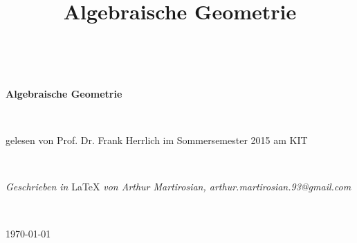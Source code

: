 \documentclass[11pt]{book}
\title{Algebraische Geometrie}
\theoremstyle{nonumberbreak}
\begin{document}
\begin{titlepage}

\textrm{ }\\[64pt]

\begin{center}
{\fontsize{40}{40} \selectfont \textbf{Algebraische Geometrie}}
\end{center}
\textrm{ } \\[36pt]
\begin{center} \large{\textrm{gelesen von Prof. Dr. Frank Herrlich im Sommersemester 2015 am KIT}} \end{center}
\textrm{ } \\[320pt]
\begin{center} \large{\textit{Geschrieben in } \LaTeX \textit{ von Arthur Martirosian, arthur.martirosian.93@gmail.com}}\end{center}
\textrm{ }\\[24pt]
\begin{center} \large{\today} \end{center}

\end{titlepage}
\thispagestyle{empty}



\begin{spacing}{1.62}
\setcounter{tocdepth}{1}
\tableofcontents
\thispagestyle{empty}
\end{spacing}
\newpage
\end{document}
